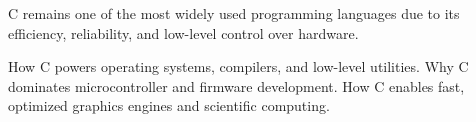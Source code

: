 \begin{NxSSBox}
	\begin{NxIDBox}
		C remains one of the most widely used programming languages due to its efficiency, reliability, and low-level control over hardware.
	\end{NxIDBox}
	\begin{NxIDBoxL}
		 How C powers operating systems, compilers, and low-level utilities.
		 Why C dominates microcontroller and firmware development.
		 How C enables fast, optimized graphics engines and scientific computing.
	\end{NxIDBoxL}
\end{NxSSBox}




